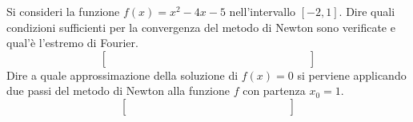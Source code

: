 Si consideri la funzione $f(x)=x^2-4x-5$ nell'intervallo $[-2,1]$. 
Dire quali condizioni sufficienti per la convergenza del metodo 
di Newton sono verificate e qual'\`{e} l'estremo di Fourier.
\medskip
\[
\left [
\begin{array}{cccccccccccccc}
\quad &  \quad & \quad &  \quad & \quad & \quad & \quad & \quad  & \quad & \quad \\
\quad &  \quad & \quad &  \quad & \quad &  \quad & \quad & \quad & \quad & \quad  \\
\quad &  \quad & \quad &  \quad  & \quad  & \quad & \quad & \quad 
& \quad & \quad
\end{array}\right]
\]
\noindent Dire a quale approssimazione della soluzione di $f(x)=0$ 
si perviene applicando due passi del metodo di Newton alla 
funzione $f$ con partenza $x_0=1$.
\medskip
\[
\left [
\begin{array}{cccccccccccccc}
\quad &  \quad & \quad &  \quad & \quad & \quad & \quad & \quad  \\
\quad &  \quad & \quad &  \quad & \quad &  \quad & \quad & \quad \\
\quad &  \quad & \quad &  \quad  & \quad  & \quad & \quad & \quad
\end{array}\right]
\]

